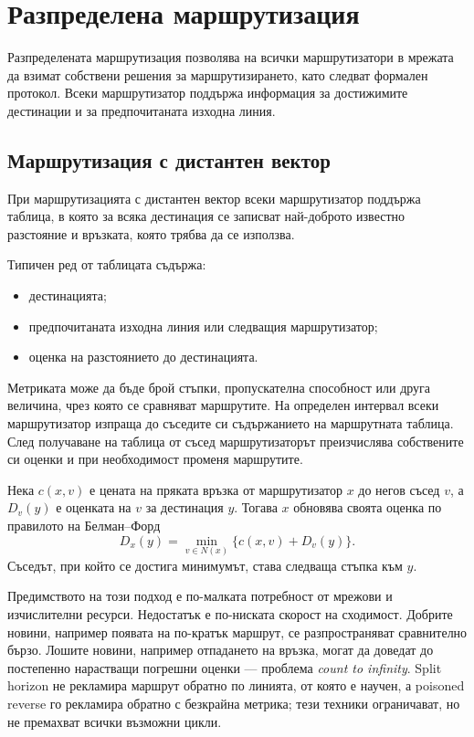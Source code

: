 \section{Разпределена маршрутизация}\label{s:13.3}

\begin{defn}
Разпределената маршрутизация позволява на всички маршрутизатори в мрежата да взимат собствени решения за маршрутизирането, като следват формален протокол. Всеки маршрутизатор поддържа информация за достижимите дестинации и за предпочитаната изходна линия.
\end{defn}

\subsection{Маршрутизация с дистантен вектор}\label{s:13.3.1}

\begin{defn}
При маршрутизацията с дистантен вектор всеки маршрутизатор поддържа таблица, в която за всяка дестинация се записват най-доброто известно разстояние и връзката, която трябва да се използва.
\end{defn}

Типичен ред от таблицата съдържа:

\begin{itemize}
    \item дестинацията;
    \item предпочитаната изходна линия или следващия маршрутизатор;
    \item оценка на разстоянието до дестинацията.
\end{itemize}

Метриката може да бъде брой стъпки, пропускателна способност или друга величина, чрез която се сравняват маршрутите. На определен интервал всеки маршрутизатор изпраща до съседите си съдържанието на маршрутната таблица. След получаване на таблица от съсед маршрутизаторът преизчислява собствените си оценки и при необходимост променя маршрутите.

Нека $c(x,v)$ е цената на пряката връзка от маршрутизатор $x$ до негов съсед $v$, а $D_v(y)$ е оценката на $v$ за дестинация $y$. Тогава $x$ обновява своята оценка по правилото на Белман--Форд
\[
D_x(y)=\min_{v\in N(x)}\{c(x,v)+D_v(y)\}.
\]
Съседът, при който се достига минимумът, става следваща стъпка към $y$.

Предимството на този подход е по-малката потребност от мрежови и изчислителни ресурси. Недостатък е по-ниската скорост на сходимост. Добрите новини, например появата на по-кратък маршрут, се разпространяват сравнително бързо. Лошите новини, например отпадането на връзка, могат да доведат до постепенно нарастващи погрешни оценки --- проблема \emph{count to infinity}. Split horizon не рекламира маршрут обратно по линията, от която е научен, а poisoned reverse го рекламира обратно с безкрайна метрика; тези техники ограничават, но не премахват всички възможни цикли.

